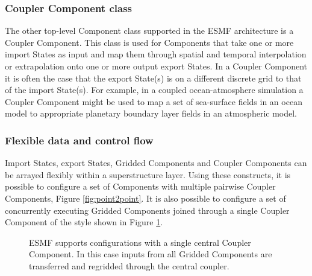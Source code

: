 \subsubsection{Coupler Component class}
The other top-level Component class supported in the ESMF architecture is a 
Coupler Component. This class is used for Components that take one or more 
import States as input and map them through spatial and temporal interpolation 
or extrapolation onto one or more output export States. In a Coupler Component
it is often the case that the export State(s) is on a different discrete grid 
to that of the import State(s). For example, in a coupled ocean-atmosphere 
simulation a Coupler Component might be used to map a set of sea-surface fields 
in an ocean model to appropriate planetary boundary layer fields in an 
atmospheric model.

\subsubsection{Flexible data and control flow}
Import States, export States, Gridded Components and Coupler Components can 
be arrayed flexibly within a superstructure layer. Using these constructs, it 
is possible to configure a set of Components with multiple
pairwise Coupler Components, Figure \ref{fig:point2point}.  It is also
possible to configure a set of concurrently
executing Gridded Components joined through a single Coupler Component of the 
style shown in Figure \ref{fig:hubspoke}. 

\begin{figure}
\caption{ESMF supports configurations with a single central Coupler Component. 
In this case inputs from all Gridded 
Components are transferred and regridded through the central coupler.}
\label{fig:hubspoke}
\end{figure}

